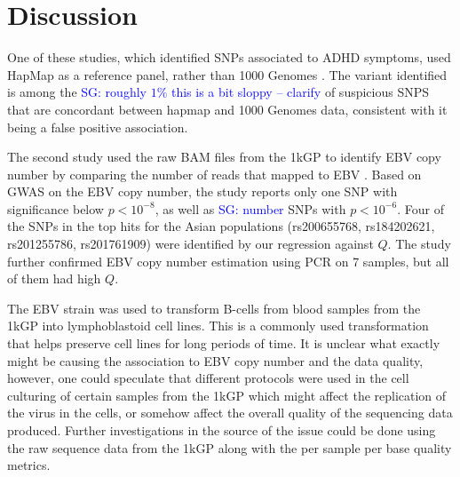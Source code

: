 \documentclass[9pt,lineno]{elife}
\newcommand{\sgcomment}[1]{\textcolor{blue}{SG: #1}}
\begin{document}
\section{Discussion}
One of these studies, which identified SNPs associated to ADHD symptoms, used HapMap as a reference panel, rather than 1000 Genomes \citep{Ebejer2013}. The variant identified is among the \sgcomment{roughly $1\%$ this is a bit sloppy -- clarify} of suspicious SNPS that are concordant between hapmap and 1000 Genomes data, consistent with it being a false positive association.

The second study used the raw BAM files from the 1kGP to identify EBV copy number by comparing the number of reads that mapped to EBV \citep{Mandage2017}.
Based on GWAS on the EBV copy number, the study reports only one SNP with significance below $ p < 10^{-8}$, as well as \sgcomment{number} SNPs with $ p < 10^{-6}$. 
Four of the SNPs in the top hits for the Asian populations (rs200655768, rs184202621, rs201255786, rs201761909) were identified by our regression against $Q$. The study further confirmed EBV copy number estimation using PCR on 7 samples, but all of them had high $Q$.
 

The EBV strain was used to transform B-cells from blood samples from the 1kGP into lymphoblastoid cell lines.
This is a commonly used transformation that helps preserve cell lines for long periods of time.
It is unclear what exactly might be causing the association to EBV copy number and the data quality, however, one could speculate that different protocols were used in the cell culturing of certain samples from the 1kGP which might affect the replication of the virus in the cells, or somehow affect the overall quality of the sequencing data produced.
Further investigations in the source of the issue could be done using the raw sequence data from the 1kGP along with the per sample per base quality metrics. 			
\end{document}
